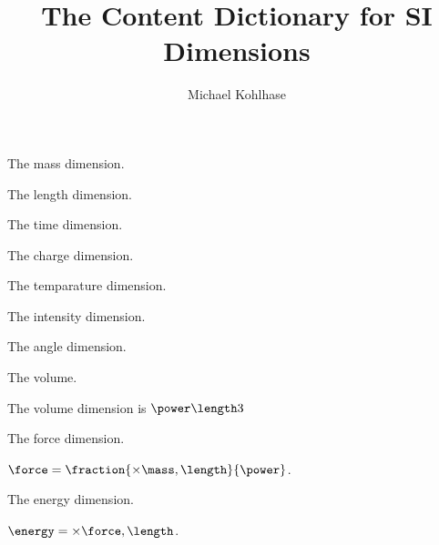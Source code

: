 \documentclass[twoside]{omdoc}
\title{The Content Dictionary for SI Dimensions}
\author{Michael Kohlhase}
\begin{document}
\maketitle

\begin{module}[id=dimensions]

\begin{consymb}[name=mass]
  The mass dimension.
\end{consymb}


\begin{consymb}[name=length]
  The length dimension.
\end{consymb}

\begin{consymb}[name=time]
  The time dimension.
\end{consymb}

\begin{consymb}[name=charge]
  The charge dimension.
\end{consymb} 

\begin{consymb}[name=temperature]
  The temparature dimension.
\end{consymb} 

\begin{consymb}[name=intensity]
  The intensity dimension.
\end{consymb}

\begin{consymb}[name=angle]
  The angle dimension.
\end{consymb}

\begin{consymb}[name=volume]
  The volume.
\end{consymb}
\begin{definition}[for=volume,type=simple]
  The volume dimension is $\power\length3$
\end{definition}

\begin{consymb}[name=force]
  The force dimension.
\end{consymb}
\begin{definition}[for=force,type=implicit]
  $\force=\fraction{\times{\mass,\length}}{\power\time2}$.
\end{definition}

\begin{consymb}[name=energy]
  The energy dimension.
\end{consymb}
\begin{definition}[for=energy,type=implicit]
  $\energy=\times{\force,\length}$.
\end{definition}

\end{module}
\end{document}
